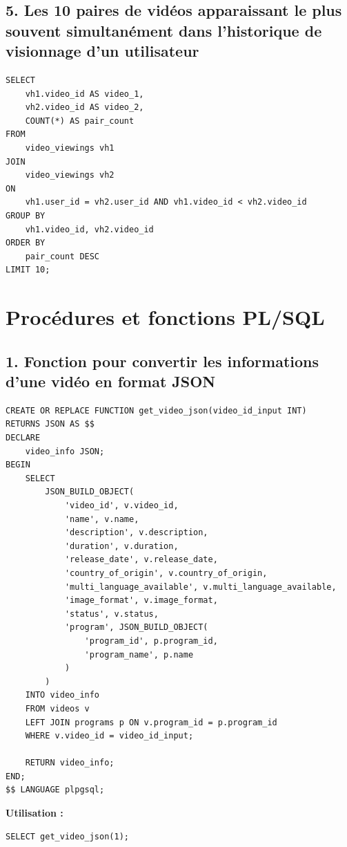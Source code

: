 \documentclass[a4paper, 12pt]{article}
\begin{document}
\subsection*{5. Les 10 paires de vidéos apparaissant le plus souvent simultanément dans l'historique de visionnage d'un utilisateur}

\begin{lstlisting}
SELECT 
    vh1.video_id AS video_1,
    vh2.video_id AS video_2,
    COUNT(*) AS pair_count
FROM 
    video_viewings vh1
JOIN 
    video_viewings vh2 
ON 
    vh1.user_id = vh2.user_id AND vh1.video_id < vh2.video_id
GROUP BY 
    vh1.video_id, vh2.video_id
ORDER BY 
    pair_count DESC
LIMIT 10;
\end{lstlisting}

\section*{Procédures et fonctions PL/SQL}

\subsection*{1. Fonction pour convertir les informations d'une vidéo en format JSON}

\begin{lstlisting}
CREATE OR REPLACE FUNCTION get_video_json(video_id_input INT)
RETURNS JSON AS $$
DECLARE
    video_info JSON;
BEGIN
    SELECT 
        JSON_BUILD_OBJECT(
            'video_id', v.video_id,
            'name', v.name,
            'description', v.description,
            'duration', v.duration,
            'release_date', v.release_date,
            'country_of_origin', v.country_of_origin,
            'multi_language_available', v.multi_language_available,
            'image_format', v.image_format,
            'status', v.status,
            'program', JSON_BUILD_OBJECT(
                'program_id', p.program_id,
                'program_name', p.name
            )
        )
    INTO video_info
    FROM videos v
    LEFT JOIN programs p ON v.program_id = p.program_id
    WHERE v.video_id = video_id_input;

    RETURN video_info;
END;
$$ LANGUAGE plpgsql;
\end{lstlisting}

\textbf{Utilisation :}

\begin{lstlisting}
SELECT get_video_json(1);
\end{lstlisting}
\end{document}
